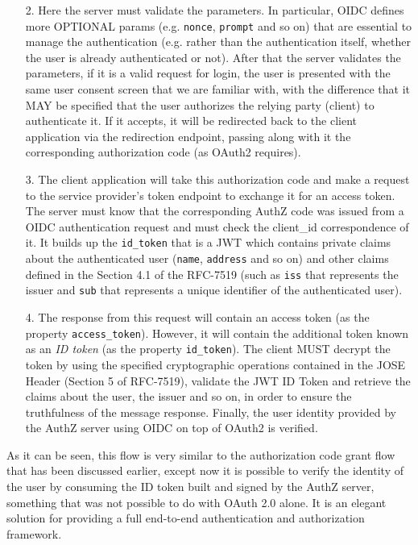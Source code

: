 \begin{itemize}
    \item[2.] Here the server must validate the parameters. In particular, OIDC defines more OPTIONAL params (e.g. \texttt{nonce}, \texttt{prompt} and so on) that are essential to manage the authentication (e.g. rather than the authentication itself, whether the user is already authenticated or not). After that the server validates the parameters, if it is a valid request for login, the user is presented with the same user consent screen that we are familiar with, with the difference that it MAY be specified that the user authorizes the relying party (client) to authenticate it. If it accepts, it will be redirected back to the client application via the redirection endpoint, passing along with it the corresponding authorization code (as OAuth2 requires).
    \item[3.] The client application will take this authorization code and make a request to the service provider's token endpoint to exchange it for an access token. The server must know that the corresponding AuthZ code was issued from a OIDC authentication request and must check the client\_id correspondence of it. It builds up the \texttt{id\_token} that is a JWT which contains private claims about the authenticated user (\texttt{name}, \texttt{address} and so on) and other claims defined in the Section 4.1 of the RFC-7519 \cite{RFC7519} (such as \texttt{iss} that represents the issuer and \texttt{sub} that represents a unique identifier of the authenticated user).
    \item[4.] The response from this request will contain an access token (as the property \texttt{access\_token}). However, it will contain the additional token known as an \textit{ID token} (as the property \texttt{id\_token}). The client MUST decrypt the token by using the specified cryptographic operations contained in the JOSE Header (Section 5 of RFC-7519), validate the JWT ID Token and retrieve the claims about the user, the issuer and so on, in order to ensure the truthfulness of the message response. Finally, the user identity provided by the AuthZ server using OIDC on top of OAuth2 is verified.
\end{itemize}


As it can be seen, this flow is very similar to the authorization code grant flow that has been discussed earlier, except now it is possible to verify the identity of the user by consuming the ID token built and signed by the AuthZ server, something that was not possible to do with OAuth 2.0 alone. It is an elegant solution for providing a full end-to-end authentication and authorization framework.